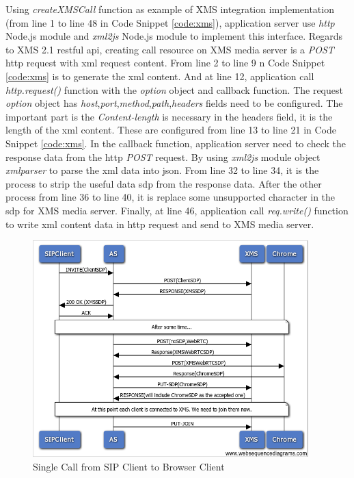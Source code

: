 \par Using \textit{createXMSCall} function as example of XMS integration implementation (from line 1 to line 48 in Code Snippet \ref{code:xms}), application server use \textit{http} Node.js module and \textit{xml2js} Node.js module to implement this interface. Regards to XMS 2.1 \gls{rest}ful \gls{api}, creating call resource on XMS media server is a \textit{POST} \gls{http} request with \gls{xml} request content. From line 2 to line 9 n Code Snippet \ref{code:xms} is to generate the \gls{xml} content. And at line 12, application call \textit{http.request()} function with the \textit{option} object and callback function. The request \textit{option} object has \textit{host},\textit{port},\textit{method},\textit{path},\textit{headers} fields need to be configured. The important part is the \textit{Content-length} is necessary in the headers field, it is the length of the \gls{xml} content. These are configured from line 13 to line 21 in Code Snippet \ref{code:xms}. In the callback function, application server need to check the response data from the \gls{http} \textit{POST} request. By using \textit{xml2js} module object \textit{xmlparser} to parse the \gls{xml} data into \gls{json}. From line 32 to line 34, it is the process to strip the useful data \gls{sdp} from the response data. After the other process from line 36 to line 40, it is replace some unsupported character in the \gls{sdp} for XMS media server. Finally, at line 46, application call \textit{req.write()} function to write \gls{xml} content data in \gls{http} request and send to XMS media server.

\begin{figure}
	\centering
    	\includegraphics[width=0.95\textwidth,natwidth=610,natheight=642]{figs/sip2xms.png}
  	\caption{Single Call from SIP Client to Browser Client}
  	\label{fig:sip2xms}
\end{figure}

